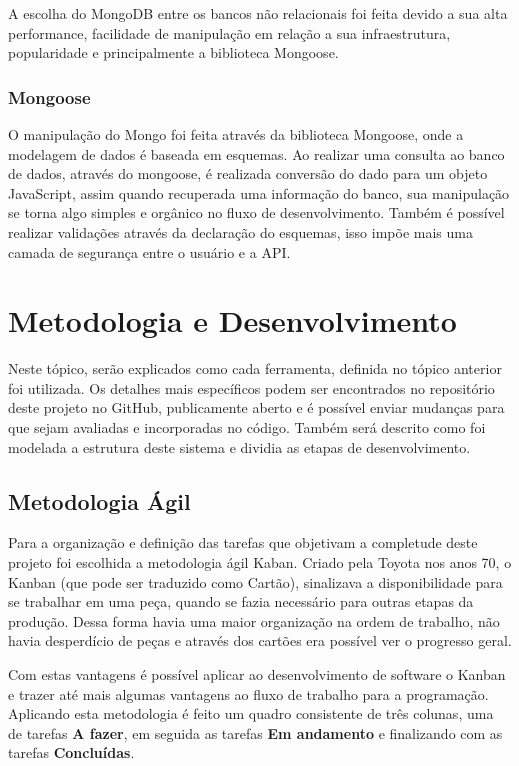 A escolha do MongoDB entre os bancos não relacionais foi feita devido a sua alta performance, facilidade de manipulação em relação a sua infraestrutura, popularidade e principalmente a biblioteca Mongoose. 

\subsubsection{Mongoose}

O manipulação do Mongo foi feita através da biblioteca Mongoose, onde a modelagem de dados é baseada em esquemas. Ao realizar uma consulta ao banco de dados, através do mongoose, é realizada conversão do dado para um objeto JavaScript, assim quando recuperada uma informação do banco, sua manipulação se torna algo simples e orgânico no fluxo de desenvolvimento. Também é possível realizar validações através da declaração do esquemas, isso impõe mais uma camada de segurança entre o usuário e a API. 

\section{Metodologia e Desenvolvimento}

Neste tópico, serão explicados como cada ferramenta, definida no tópico anterior foi utilizada. Os detalhes mais específicos podem ser encontrados no repositório deste projeto no GitHub, publicamente aberto e é possível enviar mudanças para que sejam avaliadas e incorporadas no código. Também será descrito como foi modelada a estrutura deste sistema e dividia as etapas de desenvolvimento.

\subsection{Metodologia Ágil}

Para a organização e definição das tarefas que objetivam a completude deste projeto foi escolhida a metodologia ágil Kaban. Criado pela Toyota nos anos 70, o Kanban (que pode ser traduzido como Cartão),  sinalizava a disponibilidade para se trabalhar em uma peça, quando se fazia necessário para outras etapas da produção. Dessa forma havia uma maior organização na ordem de trabalho, não havia desperdício de peças e através dos cartões era possível ver o progresso geral.

Com estas vantagens é possível aplicar ao desenvolvimento de software o Kanban e trazer até mais algumas vantagens ao fluxo de trabalho para a programação. 
Aplicando esta metodologia é feito um quadro consistente de três colunas, uma de tarefas \textbf{A fazer}, em seguida as tarefas \textbf{Em andamento} e finalizando com as tarefas \textbf{Concluídas}.


